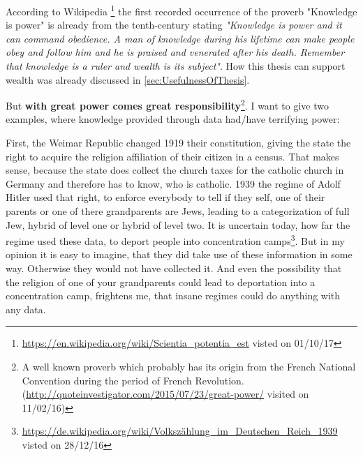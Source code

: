 \documentclass[12pt, twoside]{report}
\begin{document}
According to Wikipedia \footnote{\url{https://en.wikipedia.org/wiki/Scientia_potentia_est} visted on 01/10/17} the first recorded occurrence of the proverb "Knowledge is power" is already from the tenth-century stating \textit{"Knowledge is power and it can command obedience. A man of knowledge during his lifetime can make people obey and follow him and he is praised and venerated after his death. Remember that knowledge is a ruler and wealth is its subject"}. How this thesis can support wealth was already discussed in \cref{sec:UsefulnessOfThesis}.

But \textbf{with great power comes great responsibility}\footnote{A well known proverb which probably has its origin from the French National Convention during the period of French Revolution. (\url{http://quoteinvestigator.com/2015/07/23/great-power/} visited on 11/02/16)}. I want to give two examples, where knowledge provided through data had/have terrifying power:

First, the Weimar Republic changed 1919 their constitution, giving the state the right to acquire the religion affiliation of their citizen in a census. That makes sense, because the state does collect the church taxes for the catholic church in Germany and therefore has to know, who is catholic. 1939 the regime of Adolf Hitler used that right, to enforce everybody to tell if they self, one of their parents or one of there grandparents are Jews, leading to a categorization of full Jew, hybrid of level one or hybrid of level two. It is uncertain today, how far the regime used these data, to deport people into concentration camps\footnote{\url{https://de.wikipedia.org/wiki/Volkszählung_im_Deutschen_Reich_1939} visted on 28/12/16}. But in my opinion it is easy to imagine, that they did take use of these information in some way. Otherwise they would not have collected it. And even the possibility that the religion of one of your grandparents could lead to deportation into a concentration camp, frightens me, that insane regimes could do anything with any data.
\end{document}
